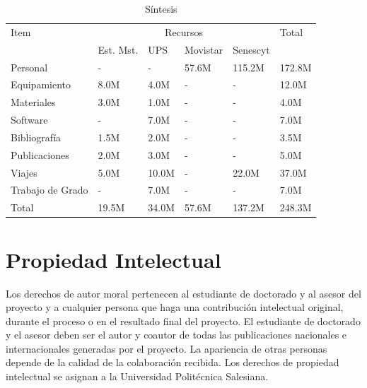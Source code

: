 \documentclass[12pt,a4paper]{article}
\begin{document}
\begin{table}[H]
\caption{Síntesis}
\begin{tabular}{|p{7.0cm}|p{1.1cm}|p{1.1cm}|p{1.1cm}|p{1.1cm}|p{1.1cm}|} \hline
Item & \multicolumn{4}{|c|}{Recursos} & Total \\ \cline{2-5}
  & Est. Mst. & UPS & Movistar & Senescyt &  \\ \hline \hline

Personal     & -    & -    & 57.6M & 115.2M & 172.8M \\ \hline
Equipamiento    & 8.0M & 4.0M & -     & -      & 12.0M \\ \hline
Materiales     & 3.0M & 1.0M & -     & -      & 4.0M \\ \hline
Software      & -    & 7.0M & -     & -      & 7.0M \\ \hline
Bibliografía  & 1.5M & 2.0M & -     & -      & 3.5M \\ \hline
Publicaciones  & 2.0M & 3.0M & -     & -      & 5.0M \\ \hline
Viajes         & 5.0M & 10.0M& -     & 22.0M  &37.0M \\ \hline
Trabajo de Grado        & -    & 7.0M & -     & -      & 7.0M \\ \hline
Total         &19.5M & 34.0M& 57.6M & 137.2M & 248.3M \\ \hline
\end{tabular}
\end{table}


\section{Propiedad Intelectual}
Los derechos de autor moral pertenecen al estudiante de doctorado y al asesor del proyecto y a cualquier persona que haga una contribución intelectual original, durante el proceso o en el resultado final del proyecto. El estudiante de doctorado y el asesor deben ser el autor y coautor de todas las publicaciones nacionales e internacionales generadas por el proyecto. La apariencia de otras personas depende de la calidad de la colaboración recibida. Los derechos de propiedad intelectual se asignan a la Universidad Politécnica Salesiana. 




\vfill
\end{document}
